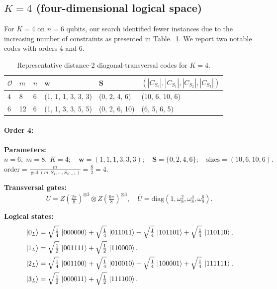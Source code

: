 \documentclass[pdflatex,sn-nature]{sn-jnl}%
\theoremstyle{thmstyleone}%
\theoremstyle{thmstyletwo}%
\theoremstyle{thmstylethree}%
\begin{document}
\begin{appendices}
\subsection{$K=4$ (four-dimensional logical space)}

For $K=4$ on $n=6$ qubits, our search identified fewer instances due to the increasing number of constraints as presented in Table.~\ref{tab:K=4}. We report two notable codes with orders 4 and 6.

\begin{table}[t]
  \caption{Representative distance-2 diagonal-transversal codes for $K=4$.}
  \label{tab:K=4}
  \begin{tabular*}{\textwidth}{@{\extracolsep{\fill}}llllll}
    \toprule
    $\mathcal{O}$ & $m$ & $n$ & $\mathbf w$
    & $\mathbf S$ & $(|C_{S_{0}}|,|C_{S_{1}}|, |C_{S_{2}}|, |C_{S_{3}}|)$ \\
    \midrule
    4   & 8   & 6 & (1, 1, 1, 3, 3, 3)        & (0, 2, 4, 6)  & (10, 6, 10, 6) \\
    6   & 12  & 6 & (1, 1, 3, 3, 5, 5)        & (0, 2, 6, 10) & (6, 5, 6, 5)\\
    \bottomrule
  \end{tabular*}
\end{table}

\paragraph{\textbf{Order 4:}} 
\noindent\textbf{Parameters:} $n=6,\; m=8,\; K=4;\quad \mathbf w=(1, 1, 1, 3, 3, 3);\quad \mathbf S=\{0, 2, 4, 6\};\quad \text{sizes}=\left(10, 6, 10, 6\right).$
$\displaystyle \text{order}=\frac{m}{\gcd(m,S_1,\dots,S_{K-1})}=\frac{8}{2}=4.$

\noindent\textbf{Transversal gates:}
\[
    U=Z \left(\tfrac{2\pi}{8}\right)^{\otimes3} \otimes Z \left(\tfrac{6\pi}{8}\right)^{\otimes3},\quad
    \overline U=\mathrm{diag}(1,\omega_8^{2},\omega_8^{4},\omega_8^{6}).
\]

\noindent\textbf{Logical states:}
\begin{align*}
    &\ket{0_L} = \sqrt{\tfrac{1}{4}}\,\ket{000000} + \sqrt{\tfrac{1}{4}}\,\ket{011011} + \sqrt{\tfrac{1}{4}}\,\ket{101101} + \sqrt{\tfrac{1}{4}}\,\ket{110110}, \\
    &\ket{1_L} = \sqrt{\tfrac{1}{2}}\,\ket{001111} + \sqrt{\tfrac{1}{2}}\,\ket{110000}, \\
    &\ket{2_L} = \sqrt{\tfrac{1}{4}}\,\ket{001100} + \sqrt{\tfrac{1}{4}}\,\ket{010010} + \sqrt{\tfrac{1}{4}}\,\ket{100001} + \sqrt{\tfrac{1}{4}}\,\ket{111111}, \\
    &\ket{3_L} = \sqrt{\tfrac{1}{2}}\,\ket{000011} + \sqrt{\tfrac{1}{2}}\,\ket{111100}.
\end{align*}


\end{appendices}
\end{document}
